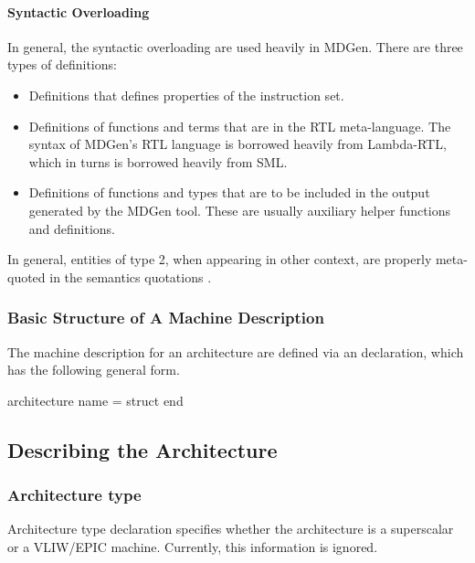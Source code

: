 \paragraph{Syntactic Overloading}
In general, the syntactic overloading are used heavily in MDGen.
There are three types of definitions:
\begin{itemize}
 \item Definitions that defines properties of the instruction set.
 \item Definitions of functions and terms that are in the RTL meta-language.
The syntax of MDGen's RTL language is borrowed heavily from Lambda-RTL, 
which in turns is borrowed heavily from SML.
 \item Definitions of functions and types that are to be included in the
output generated by the MDGen tool.  These are usually auxiliary
helper functions and definitions.
\end{itemize}
In general, entities of type 2, when appearing in other context, are
properly meta-quoted in the semantics quotations \sml{[[ ]]}.

\subsubsection{Basic Structure of A Machine Description}

   The machine description for an architecture are defined via
an  declaration, which has the following general
form.

\begin{SML}
architecture name =
struct
end
\end{SML}

\subsection{Describing the Architecture} 

\subsubsection{Architecture type}
  Architecture type declaration specifies whether the architecture is
a superscalar or a VLIW/EPIC machine.  Currently, this information is
ignored.

